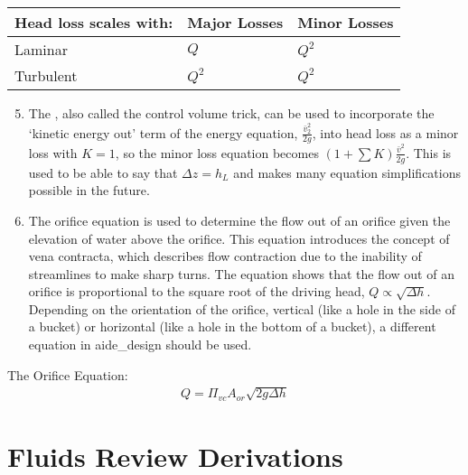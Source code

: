 \documentclass[letterpaper,10pt,english]{sphinxmanual}
\begin{document}
\begin{savenotes}\sphinxattablestart
\centering
\begin{tabulary}{\linewidth}[t]{|T|T|T|}
\hline
\sphinxstyletheadfamily 
Head loss scales with:
&\sphinxstyletheadfamily 
Major Losses
&\sphinxstyletheadfamily 
Minor Losses
\\
\hline
Laminar
&
\(Q\)
&
\(Q^2\)
\\
\hline
Turbulent
&
\(Q^2\)
&
\(Q^2\)
\\
\hline
\end{tabulary}
\par
\sphinxattableend\end{savenotes}
\begin{enumerate}
\setcounter{enumi}{4}
\item {} 
The , also called the control volume trick, can be used to incorporate the ‘kinetic energy out’ term of the energy equation, \(\frac{\bar v_2^2}{2g}\), into head loss as a minor loss with \(K = 1\), so the minor loss equation becomes \(\left( 1 + \sum K \right) \frac{\bar v^2}{2g}\). This is used to be able to say that \(\Delta z = h_L\) and makes many equation simplifications possible in the future.

\item {} 
 The orifice equation is used to determine the flow out of an orifice given the elevation of water above the orifice. This equation introduces the concept of vena contracta, which describes flow contraction due to the inability of streamlines to make sharp turns. The equation shows that the flow out of an orifice is proportional to the square root of the driving head, \(Q \propto \sqrt{\Delta h}\). Depending on the orientation of the orifice, vertical (like a hole in the side of a bucket) or horizontal (like a hole in the bottom of a bucket), a different equation in aide\_design should be used.

\end{enumerate}

The Orifice Equation:
\begin{equation}\label{equation:Fluids_Review/Fluids_Review_Design:Fluids_Review/Fluids_Review_Design:41}
\begin{split}Q = \Pi_{vc} A_{or} \sqrt{2g\Delta h}\end{split}
\end{equation}

\chapter{Fluids Review Derivations}
\label{\detokenize{Fluids_Review/Fluids_Review_Derivations:fluids-review-derivations}}\label{\detokenize{Fluids_Review/Fluids_Review_Derivations:id1}}\label{\detokenize{Fluids_Review/Fluids_Review_Derivations::doc}}
\end{document}
